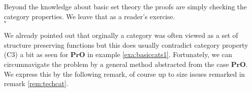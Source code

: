 \begin{exa}
\begin{enumerate}
\end{enumerate}
\end{exa}
\begin{prf}
Beyond the knowledge about basic set theory the proofs are simply checking the category properties. We leave that as a reader's exercise.
\\
\phantom{proven}
\hfill
$\square$
\end{prf}
We already pointed out that orginally a category was often viewed as a set of structure preserving functions but this does usually contradict category property (C3) a bit as seen for $\mathbf{PrO}$ in example \ref{exa:basiccats1}. Fortunately, we can circumnavigate the problem by a general method abstracted from the case $\mathbf{PrO}$. We express this by the following remark, of course up to size issues remarked in remark \ref{rem:techcat}.
\\

